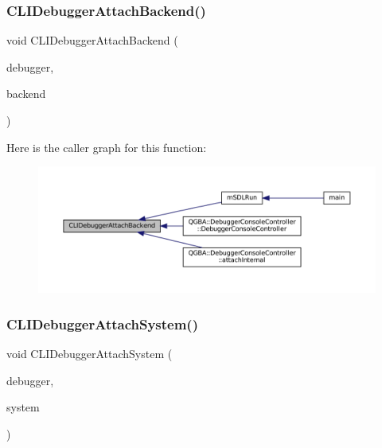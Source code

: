 \mbox{\label{debugger_2cli-debugger_8c_a4fb26a94cca83e72a28abbb0136c80cc}} 
\subsubsection{\texorpdfstring{C\+L\+I\+Debugger\+Attach\+Backend()}{CLIDebuggerAttachBackend()}}
{\footnotesize\ttfamily void C\+L\+I\+Debugger\+Attach\+Backend (\begin{DoxyParamCaption}\item[{struct C\+L\+I\+Debugger $\ast$}]{debugger,  }\item[{struct C\+L\+I\+Debugger\+Backend $\ast$}]{backend }\end{DoxyParamCaption})}

Here is the caller graph for this function\+:
\nopagebreak
\begin{figure}[H]
\begin{center}
\leavevmode
\includegraphics[width=350pt]{debugger_2cli-debugger_8c_a4fb26a94cca83e72a28abbb0136c80cc_icgraph}
\end{center}
\end{figure}
\mbox{\label{debugger_2cli-debugger_8c_a9b5442362cea68ef05c1568aba4a0716}} 
\subsubsection{\texorpdfstring{C\+L\+I\+Debugger\+Attach\+System()}{CLIDebuggerAttachSystem()}}
{\footnotesize\ttfamily void C\+L\+I\+Debugger\+Attach\+System (\begin{DoxyParamCaption}\item[{struct C\+L\+I\+Debugger $\ast$}]{debugger,  }\item[{struct C\+L\+I\+Debugger\+System $\ast$}]{system }\end{DoxyParamCaption})}

